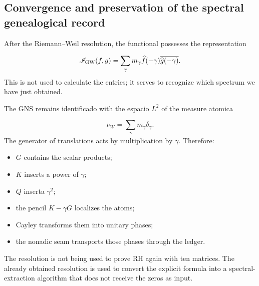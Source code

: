 \subsection{Convergence and preservation of the spectral genealogical record}
After the Riemann–Weil resolution, the functional possesses the representation\par
\[
\mathscr I_{\rm GW}(f,g)
=
\sum_\gamma
m_\gamma
\widehat f(-\gamma)
\overline{\widehat g(-\gamma)}.
\]
This is not used to calculate the entries; it serves to recognize which spectrum we have just obtained.\par
The GNS remains identificado with the espacio \(L^2\) of the measure atomica\par
\[
\nu_W=\sum_\gamma m_\gamma\delta_\gamma.
\]
The generator of translations acts by multiplication by \(\gamma\). Therefore:\par
\begin{itemize}
\item \(G\) contains the scalar products;
\item \(K\) inserts a power of \(\gamma\);
\item \(Q\) inserta \(\gamma^2\);
\item the pencil \(K-\gamma G\) localizes the atoms;
\item Cayley transforms them into unitary phases;
\item the nonadic seam transports those phases through the ledger.
\end{itemize}
The resolution is not being used to prove RH again with ten matrices. The already obtained resolution is used to convert the explicit formula into a spectral-extraction algorithm that does not receive the zeros as input.\par
{}

